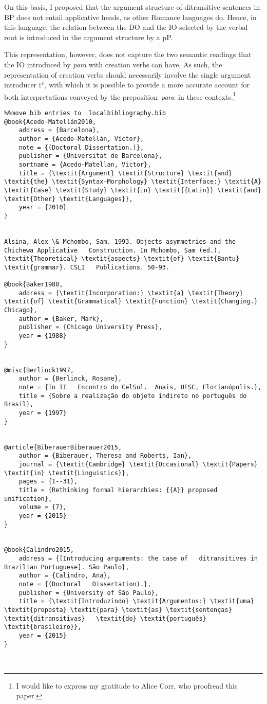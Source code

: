 \documentclass[output=paper,modfonts,nonflat]{langsci/langscibook}
\begin{document}
On this basis, I proposed that the argument structure of ditransitive sentences in BP does not entail applicative heads, as other Romance languages do. Hence, in this language, the relation between the DO and the IO selected by the verbal root is introduced in the argument structure by a pP. 

This representation, however, does not capture the two semantic readings that the IO introduced by \textit{para} with creation verbs can have. As such, the representation of creation verbs should necessarily involve the single argument introducer i*, with which it is possible to provide a more accurate account for both interpretations conveyed by the preposition~\textit{para~}in these contexts.\footnote{ \textrm{I would like to express my gratitude to Alice Corr, who proofread this paper.} }
\begin{verbatim}%%move bib entries to  localbibliography.bib
@book{Acedo-Matellán2010,
	address = {Barcelona},
	author = {Acedo-Matellán, Víctor},
	note = {(Doctoral Dissertation.)},
	publisher = {Universitat de Barcelona},
	sortname = {Acedo-Matellan, Victor},
	title = {\textit{Argument} \textit{Structure} \textit{and} \textit{the} \textit{Syntax-Morphology} \textit{Interface:} \textit{A}   \textit{Case} \textit{Study} \textit{in} \textit{{Latin}} \textit{and} \textit{Other} \textit{Languages}},
	year = {2010}
}


Alsina, Alex \& Mchombo, Sam. 1993. Objects asymmetries and the Chichewa Applicative   Construction. In Mchombo, Sam (ed.), \textit{Theoretical} \textit{aspects} \textit{of} \textit{Bantu} \textit{grammar}. CSLI   Publications. 50-93.

@book{Baker1988,
	address = {\textit{Incorporation:} \textit{a} \textit{Theory} \textit{of} \textit{Grammatical} \textit{Function} \textit{Changing.} Chicago},
	author = {Baker, Mark},
	publisher = {Chicago University Press},
	year = {1988}
}


@misc{Berlinck1997,
	author = {Berlinck, Rosane},
	note = {In II   Encontro do CelSul.  Anais, UFSC, Florianópolis.},
	title = {Sobre a realização do objeto indireto no português do Brasil},
	year = {1997}
}


@article{BiberauerBiberauer2015,
	author = {Biberauer, Theresa and Roberts, Ian},
	journal = {\textit{Cambridge} \textit{Occasional} \textit{Papers} \textit{in} \textit{Linguistics}},
	pages = {1--31},
	title = {Rethinking formal hierarchies: {{A}} proposed   unification},
	volume = {7},
	year = {2015}
}


@book{Calindro2015,
	address = {[Introducing arguments: the case of   ditransitives in Brazilian Portuguese]. São Paulo},
	author = {Calindro, Ana},
	note = {(Doctoral   Dissertation).},
	publisher = {University of São Paulo},
	title = {\textit{Introduzindo} \textit{Argumentos:} \textit{uma} \textit{proposta} \textit{para} \textit{as} \textit{sentenças}   \textit{ditransitivas}   \textit{do} \textit{português} \textit{brasileiro}},
	year = {2015}
}



\end{verbatim}
\end{document}
